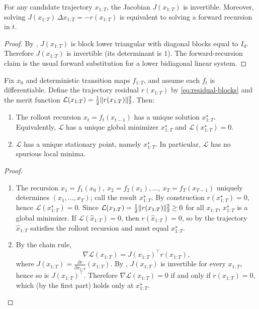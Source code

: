 \documentclass[11pt]{article}
\begin{document}
\begin{corollary}
\label{cor:newton-solve-well-defined}
For any candidate trajectory $x_{1:T}$, the Jacobian $J(x_{1:T})$ is invertible.
Moreover, solving $J(x_{1:T})\,\Delta x_{1:T}=-r(x_{1:T})$ is equivalent to solving a forward recursion in $t$.
\end{corollary}

\begin{proof}
By , $J(x_{1:T})$ is block lower triangular with diagonal blocks equal to $I_d$.
Therefore $J(x_{1:T})$ is invertible (its determinant is $1$).
The forward-recursion claim is the usual forward substitution for a lower bidiagonal linear system.%
\end{proof}

\begin{proposition}
\label{prop:unique-rollout-and-geometry}
Fix $x_0$ and deterministic transition maps $f_{1:T}$, and assume each $f_t$ is differentiable.
Define the trajectory residual $r(x_{1:T})$ by \eqref{eq:residual-blocks} and the merit function $\mathcal{L}(x_{1:T})=\tfrac12\lVert r(x_{1:T})\rVert_2^2$.
Then:
\begin{enumerate}[leftmargin=*]
  \item The rollout recursion $x_t=f_t(x_{t-1})$ has a unique solution $x^\star_{1:T}$.
  Equivalently, $\mathcal{L}$ has a unique global minimizer $x^\star_{1:T}$ and $\mathcal{L}(x^\star_{1:T})=0$.
  \item $\mathcal{L}$ has a unique stationary point, namely $x^\star_{1:T}$.
  In particular, $\mathcal{L}$ has no spurious local minima.
\end{enumerate}
\end{proposition}
\begin{proof}
\begin{enumerate}[leftmargin=*]
  \item The recursion $x_1=f_1(x_0),\ x_2=f_2(x_1),\dots,\ x_T=f_T(x_{T-1})$ uniquely determines $(x_1,\dots,x_T)$; call the result $x^\star_{1:T}$.
  By construction $r(x^\star_{1:T})=0$, hence $\mathcal{L}(x^\star_{1:T})=0$.
  Since $\mathcal{L}(x_{1:T})=\tfrac12\lVert r(x_{1:T})\rVert_2^2\ge 0$ for all $x_{1:T}$, $x^\star_{1:T}$ is a global minimizer.
  If $\mathcal{L}(\hat x_{1:T})=0$, then $r(\hat x_{1:T})=0$, so by  the trajectory $\hat x_{1:T}$ satisfies the rollout recursion and must equal $x^\star_{1:T}$.
  \item By the chain rule,
  \[
    \nabla \mathcal{L}(x_{1:T}) = J(x_{1:T})^\top r(x_{1:T}),
  \]
  where $J(x_{1:T})=\frac{\partial r}{\partial x_{1:T}}(x_{1:T})$.
  By , $J(x_{1:T})$ is invertible for every $x_{1:T}$, hence so is $J(x_{1:T})^\top$.
  Therefore $\nabla \mathcal{L}(x_{1:T})=0$ if and only if $r(x_{1:T})=0$, which (by the first part) holds only at $x^\star_{1:T}$.%
\end{enumerate}
\end{proof}
\end{document}
